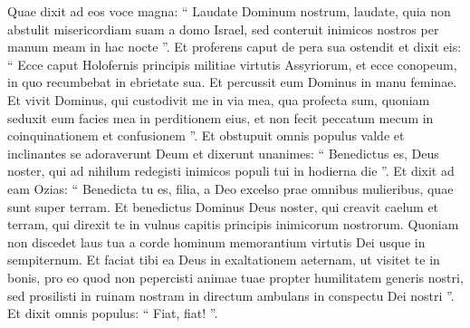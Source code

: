 \begin{biblechapter}
\begin{biblechapter}
\begin{biblechapter}
\begin{biblechapter}
\begin{biblechapter}
\begin{biblechapter}
\begin{biblechapter}
\begin{biblechapter}
\begin{biblechapter}
\begin{biblechapter}
\begin{biblechapter}
\begin{biblechapter}
\begin{biblechapter}
\verse Quae dixit ad eos voce magna: “ Laudate Dominum nostrum, laudate, quia non abstulit misericordiam suam a domo Israel, sed conteruit inimicos nostros per manum meam in hac nocte ”. 
\verse Et proferens caput de pera sua ostendit et dixit eis: “ Ecce caput Holofernis principis militiae virtutis Assyriorum, et ecce conopeum, in quo recumbebat in ebrietate sua. Et percussit eum Dominus in manu feminae. 
\verse Et vivit Dominus, qui custodivit me in via mea, qua profecta sum, quoniam seduxit eum facies mea in perditionem eius, et non fecit peccatum mecum in coinquinationem et confusionem ”.
 \verse Et obstupuit omnis populus valde et inclinantes se adoraverunt Deum et dixerunt unanimes: “ Benedictus es, Deus noster, qui ad nihilum redegisti inimicos populi tui in hodierna die ”. 
\verse Et dixit ad eam Ozias: “ Benedicta tu es, filia, a Deo excelso prae omnibus mulieribus, quae sunt super terram. Et benedictus Dominus Deus noster, qui creavit caelum et terram, qui direxit te in vulnus capitis principis inimicorum nostrorum. 
\verse Quoniam non discedet laus tua a corde hominum memorantium virtutis Dei usque in sempiternum. 
\verse Et faciat tibi ea Deus in exaltationem aeternam, ut visitet te in bonis, pro eo quod non pepercisti animae tuae propter humilitatem generis nostri, sed prosilisti in ruinam nostram in directum ambulans in conspectu Dei nostri ”. Et dixit omnis populus: “ Fiat, fiat! ”.
 

\end{biblechapter}
\end{biblechapter}
\end{biblechapter}
\end{biblechapter}
\end{biblechapter}
\end{biblechapter}
\end{biblechapter}
\end{biblechapter}
\end{biblechapter}
\end{biblechapter}
\end{biblechapter}
\end{biblechapter}
\end{biblechapter}
